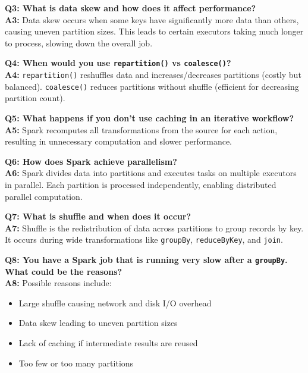 \documentclass[10pt,a4paper]{article}
\begin{document}
	\vspace{0.5em}
	
	\textbf{Q3: What is data skew and how does it affect performance?} \\
	\textbf{A3:} Data skew occurs when some keys have significantly more data than others, causing uneven partition sizes. This leads to certain executors taking much longer to process, slowing down the overall job.
	
	\vspace{0.5em}
	
	\textbf{Q4: When would you use \texttt{repartition()} vs \texttt{coalesce()}?} \\
	\textbf{A4:} \texttt{repartition()} reshuffles data and increases/decreases partitions (costly but balanced). \texttt{coalesce()} reduces partitions without shuffle (efficient for decreasing partition count).
	
	\vspace{0.5em}
	
	\textbf{Q5: What happens if you don’t use caching in an iterative workflow?} \\
	\textbf{A5:} Spark recomputes all transformations from the source for each action, resulting in unnecessary computation and slower performance.
	
	\vspace{0.5em}
	
	\textbf{Q6: How does Spark achieve parallelism?} \\
	\textbf{A6:} Spark divides data into partitions and executes tasks on multiple executors in parallel. Each partition is processed independently, enabling distributed parallel computation.
	
	\vspace{0.5em}
	
	\textbf{Q7: What is shuffle and when does it occur?} \\
	\textbf{A7:} Shuffle is the redistribution of data across partitions to group records by key. It occurs during wide transformations like \texttt{groupBy}, \texttt{reduceByKey}, and \texttt{join}.
	
	\vspace{0.5em}
	
	\textbf{Q8: You have a Spark job that is running very slow after a \texttt{groupBy}. What could be the reasons?} \\
	\textbf{A8:} Possible reasons include:
	\begin{itemize}
	    \item Large shuffle causing network and disk I/O overhead
	    \item Data skew leading to uneven partition sizes
	    \item Lack of caching if intermediate results are reused
	    \item Too few or too many partitions
	\end{itemize}
	
\end{document}
